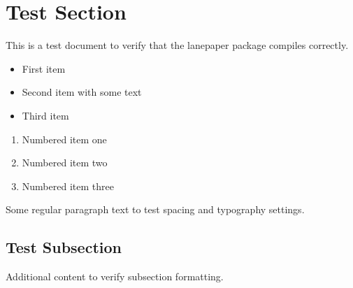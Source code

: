 \documentclass{article}
\begin{document}
\section{Test Section}
This is a test document to verify that the lanepaper package compiles correctly.

\begin{itemize}
    \item First item
    \item Second item with some text
    \item Third item
\end{itemize}

\begin{enumerate}
    \item Numbered item one
    \item Numbered item two
    \item Numbered item three
\end{enumerate}

Some regular paragraph text to test spacing and typography settings.

\subsection{Test Subsection}
Additional content to verify subsection formatting.
\end{document}
